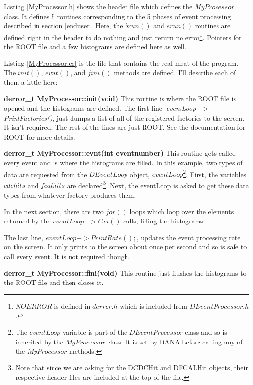 \documentclass[12pt]{article}
\begin{document}


\newpage
Listing \ref{MyProcessor.h} shows the header file which defines the
$MyProcessor$ class. It defines 5 routines corresponding to the 5
phases of event processing described in section \ref{enduser}. Here,
the $brun()$ and $erun()$ routines are defined right in the header
to do nothing and just return no error\footnote{$NOERROR$ is defined
in $derror.h$ which is included from $DEventProcessor.h$.}. Pointers
for the ROOT file and a few histograms are defined here as well.



\newpage
Listing \ref{MyProcessor.cc} is the file that contains the real meat
of the program. The $init()$, $evnt()$, and $fini()$ methods
are defined. I'll describe each of them a little here:

\begin{description}
\item{\bf derror\_t MyProcessor::init(void)}
This routine is where the ROOT file is opened and the histograms are
defined. The first line: {\it eventLoop$->$PrintFactories();} just
dumps a list of all of the registered factories to the screen. It isn't
required. The rest of the lines are just ROOT. See the documentation
for ROOT for more details.

\item{\bf derror\_t MyProcessor::evnt(int eventnumber)}
This routine gets called every event and is where the histograms
are filled. In this example, two types of data are requested from
the $DEventLoop$ object, $eventLoop$\footnote{The $eventLoop$ variable
is part of the $DEventProcessor$ class and so is inherited by
the $MyProcessor$ class. It is set by DANA before calling any of
the $MyProcessor$ methods.}. First, the variables $cdchits$ and
$fcalhits$ are declared\footnote{Note that since we are asking for
the DCDCHit and DFCALHit objects, their respective header files are
included at the top of the file.}. Next, the eventLoop is asked to
get these data types from whatever factory produces them.

In the next section, there are two $for()$ loops which loop over the elements returned by
the $eventLoop->Get()$ calls, filling the histograms.

The last line, $eventLoop->PrintRate();$, updates the event processing
rate on the screen. It only prints to the screen about once per second
and so is safe to call every event. It is not required though.

\item{\bf derror\_t MyProcessor::fini(void)}
This routine just flushes the histograms to the ROOT file and then closes it.
\end{description}


\end{document}
